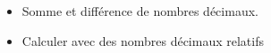 \begin{prerequis}    
    \begin{itemize}
        \item[\emoji{red-heart}] Somme et différence de nombres décimaux.
        \columnbreak
        \item[\emoji{diamond-suit}] Calculer avec des nombres décimaux relatifs        
    \end{itemize}
\end{prerequis}